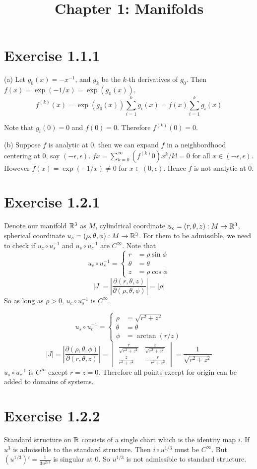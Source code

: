 \documentclass[12pt]{article}
\title{Chapter 1: Manifolds}
\begin{document}
	\maketitle
	
\section*{Exercise 1.1.1}
(a) Let $g_0(x) = -x^{-1}$, and $g_k$ be the $k$-th derivatives of $g_0$. Then $f(x) = \exp(-1/x) = \exp(g_0(x))$. 
$$f^{(k)}(x) =  \exp(g_0(x)) \sum_{i=1}^{k} g_i(x) = f(x) \sum_{i=1}^{k} g_i(x) $$

Note that $g_i(0) = 0$ and $f(0)=0$. Therefore $f^{(k)}(0) = 0$.
\QED

(b) Suppose $f$ is analytic at 0, then we can expand $f$ in a neighbordhood centering at 0, say $(-\epsilon, \epsilon)$. $fx = \sum_{k=0}^{\infty}(f^{(k)}0) x^k/k! = 0$ for all $x \in (-\epsilon, \epsilon)$. However $f(x) = \exp(-1/x) \neq 0$ for $x \in (0, \epsilon)$. Hence $f$ is not analytic at 0. \QED


\section*{Exercise 1.2.1}
Denote our manifold $\mathbb{R}^3$ as $M$, cylindrical coordinate $u_c = (r, \theta, z): M \rightarrow \mathbb{R}^3$, spherical coordinate $u_s = (\rho, \theta, \phi): M \rightarrow \mathbb{R}^3$. For them to be admissible, we need to check if $u_c \circ u_s^{-1}$ and $u_s \circ u_c^{-1}$ are $C^\infty$.
Note that \[
u_c \circ u_s^{-1} = 
 \begin{cases}
 	r &= \rho \sin \phi \\
 	\theta &= \theta \\
 	z &= \rho \cos \phi
 \end{cases}
\]
$$|J| = \left| \frac{\partial (r, \theta, z)}{\partial (\rho, \theta, \phi)} \right| = |\rho| $$
So as long as $\rho > 0$, $u_c \circ u_s^{-1}$ is $C^\infty$.

\[
u_s \circ u_c^{-1} = 
\begin{cases}
	\rho &= \sqrt{r^2 + z^2} \\
	\theta &= \theta \\
	\phi &= \arctan (r/z)
\end{cases}
\]
$$|J| = \left| \frac{\partial  (\rho, \theta, \phi) }{\partial(r, \theta, z)} \right| = \begin{vmatrix}
	\frac{r}{\sqrt{r^2 + z^2}} & \frac{z}{\sqrt{r^2 + z^2}} \\
	\frac{z}{r^2 + z^2} & - \frac{r}{r^2 + z^2} 
\end{vmatrix} 
= \frac{1}{\sqrt{r^2+z^2}}
$$
$u_s \circ u_c^{-1}$ is $C^\infty$ except $r = z = 0$.
Therefore all points except for origin can be added to domains of systems.

\section*{Exercise 1.2.2}
Standard structure on $\mathbb{R}$ consists of a single chart which is the identity map $i$. If $u^3$ is admissible to the standard structure. Then $i \circ u^{1/3}$ must be $C^\infty$. But $(u^{1/3})' = \frac{1}{3u^{2/3}}$ is singular at 0. So $u^{1/3}$ is not admissible to standard structure.
	
\end{document}
